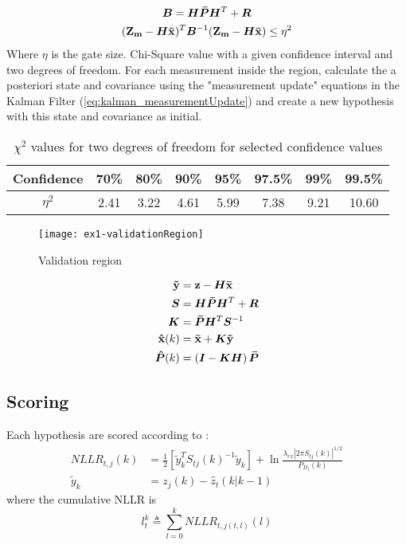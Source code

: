 \begin{gather*}
\bm{B}	= \bm{H} \bm{\bar{P}} \bm{H}^T + \bm{R} \\
(\boldsymbol{\mathbf{Z_m}} - \bm{H}\boldsymbol{\mathbf{\bar{x}}})^T	\bm{B}^{-1} (\boldsymbol{\mathbf{Z_m}} - \bm{H}\boldsymbol{\mathbf{\bar{x}}}) \leq \eta^2
\end{gather*}
Where $\eta$ is the gate size.  Chi-Square value with a given confidence interval and two degrees of freedom. For each measurement inside the region, calculate the a posteriori state and covariance using the "measurement update" equations in the Kalman Filter (\ref{eq:kalman_measurementUpdate}) and create a new hypothesis with this state and covariance as initial.

\begin{table}
\begin{tabular}{c c c c c c c c}
Confidence 	& 70\% 	& 80\% 	& 90\% 	& 95\% 	& 97.5\% 	& 99\% 	& 99.5\% \\ \hline
$\eta^2$ 	& 2.41 	& 3.22 	& 4.61 	& 5.99 	& 7.38 		& 9.21 	& 10.60
\end{tabular}
\caption{$\chi^2$ values for two degrees of freedom for selected confidence values}
\label{tab:chi_square}
\end{table}

\begin{figure}[ht]
\centering
\texttt{[image: ex1-validationRegion]}
\caption{Validation region}
\label{fig:validation_region}
\end{figure}

\begin{equation}
\begin{split}
\boldsymbol{\mathbf{\tilde{y}}}	&= \boldsymbol{\mathbf{z}} - \bm{H} \boldsymbol{\mathbf{\bar{x}}} \\
\bm{S}			&= \bm{H} \bm{\bar{P}} \bm{H}^T + \bm{R} \\
\bm{K} 			&= \bm{\bar{P}} \bm{H}^T \bm{S}^{-1} \\
\boldsymbol{\mathbf{\hat{x}}}(k) 	&= \boldsymbol{\mathbf{\bar{x}}} + \bm{K} \boldsymbol{\mathbf{\tilde{y}}} \\
\bm{\hat{P}}(k) 	&= \left( \bm{I} - \bm{K} \bm{H} \right) \bm{\bar{P}}
\end{split}
\label{eq:kalman_measurementUpdate}
\end{equation}

\subsection{Scoring}
Each hypothesis are scored according to \cite{Bar-Shalom2007}:
\begin{equation}
\begin{split}
NLLR_{t,j}(k) &= \frac{1}{2} \left[ \tilde{y}_k^T S_{tj}(k)^{-1} \tilde{y}_k \right] + \ln \frac{\lambda_{ex} |2 \pi S_{tj}(k)|^{1/2}}{P_{D_t}(k)} \\				
\tilde{y}_k &= z_j(k)-\hat{z}_t(k|k-1)
\end{split}
\end{equation}
where the cumulative NLLR is
\begin{equation}
l_t^k \triangleq \sum_{l=0}^k NLLR_{t,j(t,l)}(l)
\end{equation}

